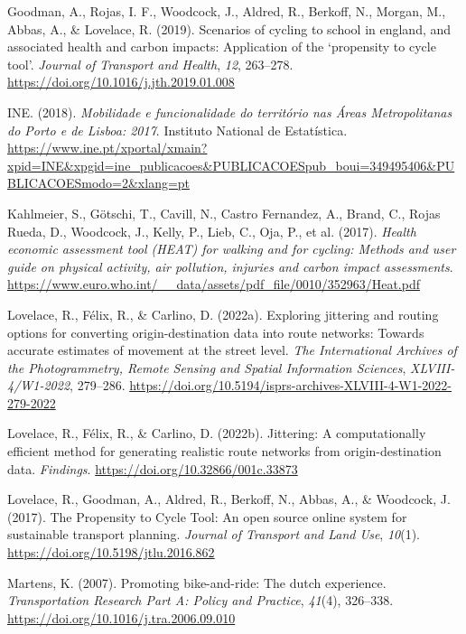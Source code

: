 \documentclass[review, doubleblind, 3p,
authoryear]{elsarticle} %
\newlength{\cslhangindent}
\newlength{\cslentryspacingunit} %
\newenvironment{CSLReferences}[2] %
 {%
  \setlength{\parindent}{0pt}
  \ifodd #1
  \let\oldpar\par
  \def\par{\hangindent=\cslhangindent\oldpar}
  \fi
  \setlength{\parskip}{#2\cslentryspacingunit}
 }%
 {}
\begin{document}
\begin{CSLReferences}{1}{0}
\leavevmode{}%
Goodman, A., Rojas, I. F., Woodcock, J., Aldred, R., Berkoff, N.,
Morgan, M., Abbas, A., \& Lovelace, R. (2019). Scenarios of cycling to
school in england, and associated health and carbon impacts: Application
of the {`}propensity to cycle tool{'}. \emph{Journal of Transport and
Health}, \emph{12}, 263--278.
\url{https://doi.org/10.1016/j.jth.2019.01.008}

\leavevmode{}%
INE. (2018). \emph{Mobilidade e funcionalidade do território nas {Áreas
Metropolitanas do Porto e de Lisboa}: 2017}. {Instituto National de
Estatística}.
\url{https://www.ine.pt/xportal/xmain?xpid=INE\&xpgid=ine_publicacoes\&PUBLICACOESpub_boui=349495406\&PUBLICACOESmodo=2\&xlang=pt}

\leavevmode{}%
Kahlmeier, S., Götschi, T., Cavill, N., Castro Fernandez, A., Brand, C.,
Rojas Rueda, D., Woodcock, J., Kelly, P., Lieb, C., Oja, P., et al.
(2017). \emph{Health economic assessment tool ({HEAT}) for walking and
for cycling: Methods and user guide on physical activity, air pollution,
injuries and carbon impact assessments}.
\url{https://www.euro.who.int/__data/assets/pdf_file/0010/352963/Heat.pdf}

\leavevmode{}%
Lovelace, R., Félix, R., \& Carlino, D. (2022a). Exploring jittering and
routing options for converting origin-destination data into route
networks: Towards accurate estimates of movement at the street level.
\emph{The International Archives of the Photogrammetry, Remote Sensing
and Spatial Information Sciences}, \emph{XLVIII-4/W1-2022}, 279--286.
\url{https://doi.org/10.5194/isprs-archives-XLVIII-4-W1-2022-279-2022}

\leavevmode{}%
Lovelace, R., Félix, R., \& Carlino, D. (2022b). Jittering: A
computationally efficient method for generating realistic route networks
from origin-destination data. \emph{Findings}.
\url{https://doi.org/10.32866/001c.33873}

\leavevmode{}%
Lovelace, R., Goodman, A., Aldred, R., Berkoff, N., Abbas, A., \&
Woodcock, J. (2017). The Propensity to Cycle Tool: An open source online
system for sustainable transport planning. \emph{Journal of Transport
and Land Use}, \emph{10}(1). \url{https://doi.org/10.5198/jtlu.2016.862}

\leavevmode{}%
Martens, K. (2007). Promoting bike-and-ride: The dutch experience.
\emph{Transportation Research Part A: Policy and Practice},
\emph{41}(4), 326--338. \url{https://doi.org/10.1016/j.tra.2006.09.010}


\end{CSLReferences}
\end{document}
